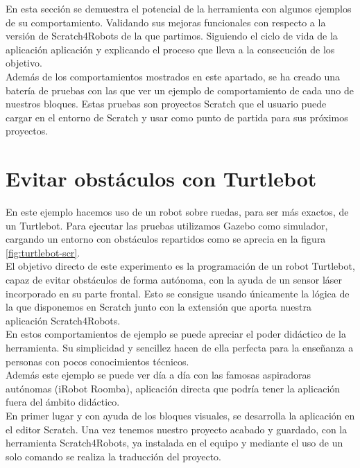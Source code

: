 En esta sección se demuestra el potencial de la herramienta con algunos ejemplos de su comportamiento. Validando  sus mejoras funcionales con respecto a la versión de Scratch4Robots de la que partimos. Siguiendo el ciclo de vida de la aplicación aplicación y explicando el proceso que lleva a la consecución de los objetivo.\\

Además de los comportamientos mostrados en este apartado, se ha creado una batería de pruebas con las que ver un ejemplo de comportamiento de cada uno de nuestros bloques. Estas pruebas son proyectos Scratch que el usuario puede cargar en el entorno de Scratch y usar como punto de partida para sus próximos proyectos.

\section{Evitar obstáculos con Turtlebot}
\label{sec:evitar-obstaculos}

En este ejemplo hacemos uso de un robot sobre ruedas, para ser más exactos, de un Turtlebot. Para ejecutar las pruebas utilizamos Gazebo como simulador, cargando un entorno con obstáculos repartidos como se aprecia en la figura \ref{fig:turtlebot-scr}.\\

El objetivo directo de este experimento es la programación de un robot Turtlebot, capaz de evitar obstáculos de forma autónoma, con la ayuda de un sensor láser incorporado en su parte frontal. Esto se consigue usando únicamente la lógica de la que disponemos en Scratch junto con la extensión que aporta nuestra aplicación Scratch4Robots.\\

En estos comportamientos de ejemplo se puede apreciar el poder didáctico de la herramienta. Su simplicidad y sencillez hacen de ella perfecta para la enseñanza a personas con pocos conocimientos técnicos.\\

Además este ejemplo se puede ver día a día con las famosas aspiradoras autónomas (iRobot Roomba), aplicación directa que podría tener la aplicación fuera del ámbito didáctico.\\

En primer lugar y con ayuda de los bloques visuales, se desarrolla la aplicación en el editor Scratch. Una vez tenemos nuestro proyecto acabado y guardado, con la herramienta Scratch4Robots, ya instalada en el equipo y mediante el uso de un solo comando se realiza la traducción del proyecto.\\

